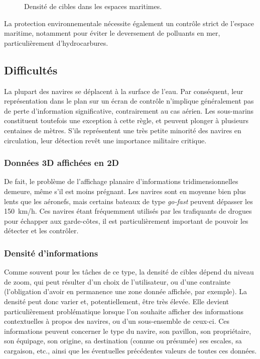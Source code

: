 \begin{figure}[!htbp]
\begin{subfigure}[t]{0.58\textwidth}
			\label{fig:lincoln}
		\end{subfigure}
		\label{fig:muddyWaters}
		\caption{Densité de cibles dans les espaces maritimes.}
	\end{figure}
	
	
	La protection environnementale nécessite également un contrôle strict de l'espace maritime, notamment pour éviter le deversement de polluants en mer, particulièrement d'hydrocarbures.
	
	\FloatBarrier \subsection{Difficultés}
	La plupart des navires se déplacent à la surface de l'eau. Par conséquent, leur représentation dans le plan sur un écran de contrôle n'implique généralement pas de perte d'information significative, contrairement au cas aérien. Les sous-marins constituent toutefois une exception à cette règle, et peuvent plonger à plusieurs centaines de mètres. S'ils représentent une très petite minorité des navires en circulation, leur détection revêt une importance militaire critique.
	
	\subsubsection{Données 3D affichées en 2D}
	De fait, le problème de l'affichage planaire d'informations tridimensionnelles demeure, même s'il est moins prégnant. Les navires sont en moyenne bien plus lents que les aéronefs, mais certains bateaux de type \emph{go-fast} peuvent dépasser les 150~km/h. Ces navires étant fréquemment utilisés par les trafiquants de drogues pour échapper aux garde-côtes, il est particulièrement important de pouvoir les détecter et les contrôler.
	
	\subsubsection{Densité d'informations}
	Comme souvent pour les tâches de ce type, la densité de cibles dépend du niveau de zoom, qui peut résulter d'un choix de l'utilisateur, ou d'une contrainte (l'obligation d'avoir en permanence une zone donnée affichée, par exemple). La densité peut donc varier et, potentiellement, être très élevée. Elle devient particulièrement problématique lorsque l'on souhaite afficher des informations contextuelles à propos des navires, ou d'un sous-ensemble de ceux-ci. Ces informations peuvent concerner le type du navire, son pavillon, son propriétaire, son équipage, son origine, sa destination (connue ou présumée) ses escales, sa cargaison, etc., ainsi que les éventuelles précédentes valeurs de toutes ces données.
	
